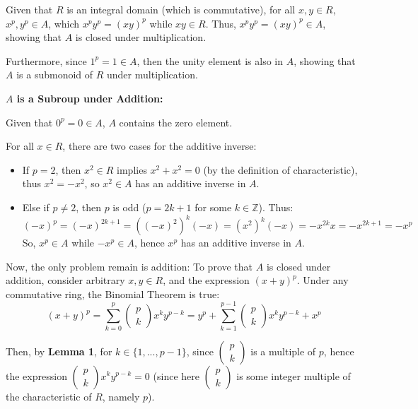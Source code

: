 \documentclass{article}
\begin{document}
Given that $R$ is an integral domain (which is commutative), for all $x,y\in R$, $x^p,y^p\in A$, which $x^py^p = (xy)^p$ while $xy\in R$.
Thus, $x^py^p = (xy)^p\in A$, showing that $A$ is closed under multiplication.

Furthermore, since $1^p=1\in A$, then the unity element is also in $A$, showing that $A$ is a submonoid of $R$ under multiplication.

\hfill

\textbf{$A$ is a Subroup under Addition:}

Given that $0^p = 0 \in A$, $A$ contains the zero element.

For all $x\in R$, there are two cases for the additive inverse:
\begin{itemize}
    \item If $p=2$, then $x^2\in R$ implies $x^2+x^2=0$ (by the definition of characteristic), thus $x^2=-x^2$, so $x^2\in A$ has an additive inverse in $A$.
    \item Else if $p\neq 2$, then $p$ is odd ($p=2k+1$ for some $k\in\mathbb{Z}$). Thus:
    $$(-x)^p = (-x)^{2k+1} = ((-x)^2)^k(-x) = (x^2)^k(-x) = -x^{2k}x = -x^{2k+1}=-x^p$$
    So, $x^p\in A$ while $-x^p\in A$, hence $x^p$ has an additive inverse in $A$.
\end{itemize}

Now, the only problem remain is addition: To prove that $A$ is closed under addition, consider arbitrary $x,y\in R$, and the expression $(x+y)^p$.
Under any commutative ring, the Binomial Theorem is true:
$$(x+y)^p = \sum_{k=0}^{p}\begin{pmatrix}
    p\\k
\end{pmatrix}x^ky^{p-k} = y^p + \sum_{k=1}^{p-1}\begin{pmatrix}
    p\\k
\end{pmatrix}x^ky^{p-k} + x^p$$

Then, by \textbf{Lemma 1}, for $k\in\{1,...,p-1\}$, since $\begin{pmatrix}
    p\\k
\end{pmatrix}$ is a multiple of $p$, hence the expression $\begin{pmatrix}
    p\\k
\end{pmatrix}x^ky^{p-k}=0$ (since here $\begin{pmatrix}p\\k \end{pmatrix}$ is some integer multiple of the characteristic of $R$, namely $p$).
\end{document}
